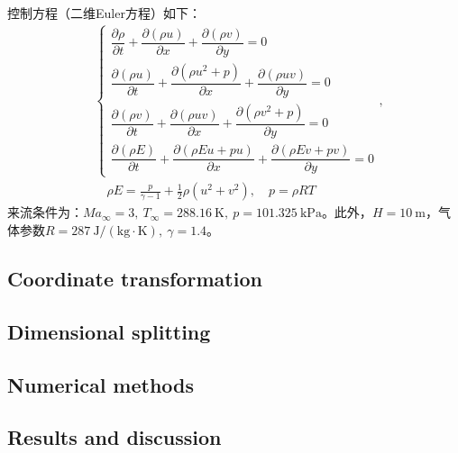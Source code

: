 \documentclass[11pt]{article}
\begin{document}
控制方程（二维Euler方程）如下：
\begin{align}
	 & \left\{\begin{array}{l}
		\dfrac{\partial\rho}{\partial t}+\dfrac{\partial(\rho u)}{\partial x}+\dfrac{\partial(\rho v)}{\partial y}=0           \\[8pt]
		\dfrac{\partial(\rho u)}{\partial t}+\dfrac{\partial(\rho u^2+p)}{\partial x}+\dfrac{\partial(\rho u v)}{\partial y}=0 \\[8pt]
		\dfrac{\partial(\rho v)}{\partial t}+\dfrac{\partial(\rho uv)}{\partial x}+\dfrac{\partial(\rho v^2+p)}{\partial y}=0  \\[8pt]
		\dfrac{\partial(\rho E)}{\partial t}+\dfrac{\partial(\rho Eu+pu)}{\partial x}+\dfrac{\partial(\rho Ev+pv)}{\partial y}=0
	\end{array}\right., \label{eqn:euler2}              \\
	 & \quad \rho E=\frac{p}{\gamma-1}+\frac{1}{2}\rho(u^2+v^2),\quad p=\rho R T
\end{align}
来流条件为：$Ma_\infty=3,\ T_\infty=288.16\ \mathrm{K},\ p=101.325\ \mathrm{kPa}$。此外，$H=10\ \mathrm{m}$，气体参数$R=287\ \mathrm{J/(kg\cdot K)},\ \gamma=1.4$。

\subsection{Coordinate transformation}

\subsection{Dimensional splitting}

\subsection{Numerical methods}

\subsection{Results and discussion}

\newpage


\end{document}
